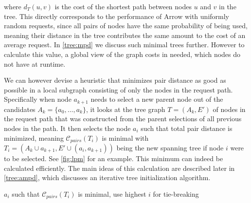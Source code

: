 \documentclass[a4paper, oneside]{discothesis}
\begin{document}
where $d_T(u,v)$ is the cost of the shortest path between nodes $u$ and $v$ in the tree. This directly corresponds to the performance of Arrow with uniformly random requests, since all pairs of nodes have the same probability of being used, meaning their distance in the tree contributes the same amount to the cost of an average request. In \autoref{tree:mpd} we discuss such minimal trees further. However to calculate this value, a global view of the graph costs in needed, which nodes do not have at runtime.

We can however devise a heuristic that minimizes pair distance as good as possible in a local subgraph consisting of only the nodes in the request path. Specifically when node $a_{k+1}$ needs to select a new parent node out of the candidates $A_k=\{a_{0},\dots,a_{k}\}$, it looks at the tree graph $T=(A_k,E')$ of nodes in the request path that was constructed from the parent selections of all previous nodes in the path. It then selects the node $a_{i}$ such that total pair distance is minimized, meaning $\mathcal{C}_{pairs}(T_i)$ is minimal with $T_i=(A_k\cup a_{k+1},E'\cup(a_{i},a_{k+1}))$ being the new spanning tree if node $i$ were to be selected. See \autoref{fig:lpm} for an example. This minimum can indeed be calculated efficiently. The main ideas of this calculation are described later in \autoref{tree:ampd}, which discusses an iterative tree initialization algorithm.

\begin{algorithmic}
\State\Return$a_{i}$ such that $\mathcal{C}_{pairs}(T_i)$ is minimal, use highest $i$ for tie-breaking
\EndFunction
\end{algorithmic}
\end{document}
